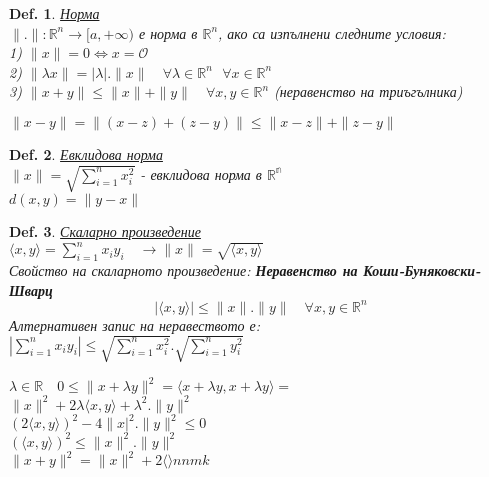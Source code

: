 \documentclass[12pt]{article}
\newtheorem{definition}{Def.}
\newcommand{\spc}{\text{ }}
\begin{document}
	\begin{definition}
		\underline{Норма}\\
		$\|.\|:\mathbb{R}^n \rightarrow [a,+\infty)$ е норма в $\mathbb{R}^n$, ако са изпълнени следните условия:\\
		1) $\|x\|=0 \Leftrightarrow x=\mathcal{O}$\\
		2) $\|\lambda x\| = |\lambda|.\|x\|\quad\forall\lambda\in\mathbb{R}^n\spc\forall x \in\mathbb{R}^n$\\
		3) $\|x+y\|\leq \|x\|+\|y\|\quad\forall x,y \in\mathbb{R}^n$ (неравенство на триъгълника)
	\end{definition}
	$\|x-y\|=\|(x-z)+(z-y)\|\leq\|x-z\|+\|z-y\|$
	\begin{definition}
		\underline{Евклидова норма}\\
		$\|x\|=\sqrt{\sum_{i=1}^{n}x_i^2}$ - евклидова норма в $\mathbb{R^n}$\\
		$d(x,y) = \|y-x\|$
	\end{definition}
	\begin{definition}
		\underline{Скаларно произведение}\\
		$\langle x,y \rangle = \sum_{i=1}^{n}x_i y_i\quad \rightarrow \|x\| = \sqrt{\langle x, y \rangle}$\\
		$\spc$\\
		Свойство на скаларното произведение: \textbf{Неравенство на Коши-Буняковски-Шварц}\\
		\[|\langle x, y \rangle| \leq \|x\|.\|y\|\quad \forall x,y \in \mathbb{R}^n\]
		$\spc$\\
		Алтернативен запис на неравеството е:\\
		$\left|\sum_{i=1}^{n}x_iy_i\right|\leq \sqrt{\sum_{i=1}^{n}x_i^2}.\sqrt{\sum_{i=1}^{n}y_i^2}$\\
		
	\end{definition}
	$\lambda\in\mathbb{R}\quad 0\leq\|x+\lambda y\|^2 = \langle x+\lambda y, x+\lambda y \rangle = $\\
	$\|x\|^2 + 2\lambda \langle x,y \rangle +\lambda^2.\|y\|^2$\\
	$(2\langle x,y \rangle)^2 - 4\|x |^2.\|y\|^2 \leq 0$\\
	$(\langle x,y \rangle)^2 \leq \|x\|^2.\|y\|^2$\\
	$\spc$\\
	$\|x+y\|^2 = \|x\|^2 + 2\langle \rangle nnmk$
	\\
	
\end{document}
